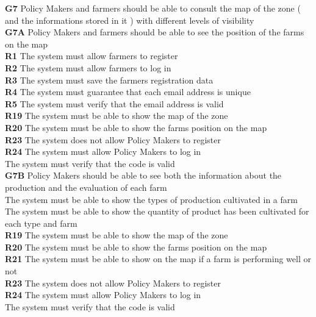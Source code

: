 \textbf{G7} Policy Makers and farmers should be able to consult the map of the zone ( and the informations stored in it ) with different levels of visibility\\
    \textbf{G7A} Policy Makers and farmers should be able to see the position of the farms on the map\\
        \textbf{R1} The system must allow farmers to register\\
        \textbf{R2} The system must allow farmers to log in\\
        \textbf{R3} The system must save the farmers registration data\\
        \textbf{R4} The system must guarantee that each email address is unique\\
        \textbf{R5} The system must verify that the email address is valid\\
        \textbf{R19} The system must be able to show the map of the zone\\
        \textbf{R20} The system must be able to show the farms position on the map\\
        \textbf{R23} The system does not allow Policy Makers to register\\
        \textbf{R24} The system must allow Policy Makers to log in\\
        \textbf{} The system must verify that the code is valid\\
        \textbf{}
        \textbf{}
        \textbf{}
    \textbf{G7B} Policy Makers should be able to see both the information about the production and the evaluation of each farm\\
        \textbf{} The system must be able to show the types of production cultivated in a farm\\
        \textbf{} The system must be able to show the quantity of product has been cultivated for each type and farm\\
        \textbf{R19} The system must be able to show the map of the zone\\
        \textbf{R20} The system must be able to show the farms position on the map\\
        \textbf{R21} The system must be able to show on the map if a farm is performing well or not\\
        \textbf{R23} The system does not allow Policy Makers to register\\
        \textbf{R24} The system must allow Policy Makers to log in\\
        \textbf{} The system must verify that the code is valid\\
